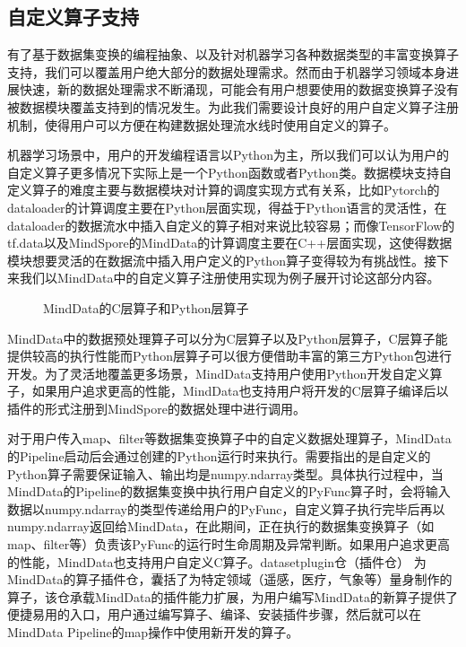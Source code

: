 \documentclass[letterpaper,10pt,english]{sphinxmanual}
\let\sphinxpxdimen\pdfpxdimen\else\newdimen\sphinxpxdimen
\begin{document}
\subsection{自定义算子支持}
\label{\detokenize{chapter_data_processing/program_model:id8}}
\sphinxAtStartPar
有了基于数据集变换的编程抽象、以及针对机器学习各种数据类型的丰富变换算子支持，我们可以覆盖用户绝大部分的数据处理需求。然而由于机器学习领域本身进展快速，新的数据处理需求不断涌现，可能会有用户想要使用的数据变换算子没有被数据模块覆盖支持到的情况发生。为此我们需要设计良好的用户自定义算子注册机制，使得用户可以方便在构建数据处理流水线时使用自定义的算子。

\sphinxAtStartPar
机器学习场景中，用户的开发编程语言以Python为主，所以我们可以认为用户的自定义算子更多情况下实际上是一个Python函数或者Python类。数据模块支持自定义算子的难度主要与数据模块对计算的调度实现方式有关系，比如Pytorch的dataloader的计算调度主要在Python层面实现，得益于Python语言的灵活性，在dataloader的数据流水中插入自定义的算子相对来说比较容易；而像TensorFlow的tf.data以及MindSpore的MindData的计算调度主要在C++层面实现，这使得数据模块想要灵活的在数据流中插入用户定义的Python算子变得较为有挑战性。接下来我们以MindData中的自定义算子注册使用实现为例子展开讨论这部分内容。

\begin{figure}[H]
\centering
\capstart

\noindent\sphinxincludegraphics[width=800\sphinxpxdimen]{{operation}.png}
\caption{MindData的C层算子和Python层算子}\label{\detokenize{chapter_data_processing/program_model:id15}}\label{\detokenize{chapter_data_processing/program_model:mindspore-operator-example}}\end{figure}

\sphinxAtStartPar
MindData中的数据预处理算子可以分为C层算子以及Python层算子，C层算子能提供较高的执行性能而Python层算子可以很方便借助丰富的第三方Python包进行开发。为了灵活地覆盖更多场景，MindData支持用户使用Python开发自定义算子，如果用户追求更高的性能，MindData也支持用户将开发的C层算子编译后以插件的形式注册到MindSpore的数据处理中进行调用。

\sphinxAtStartPar
对于用户传入map、filter等数据集变换算子中的自定义数据处理算子，MindData的Pipeline启动后会通过创建的Python运行时来执行。需要指出的是自定义的Python算子需要保证输入、输出均是numpy.ndarray类型。具体执行过程中，当MindData的Pipeline的数据集变换中执行用户自定义的PyFunc算子时，会将输入数据以numpy.ndarray的类型传递给用户的PyFunc，自定义算子执行完毕后再以numpy.ndarray返回给MindData，在此期间，正在执行的数据集变换算子（如map、filter等）负责该PyFunc的运行时生命周期及异常判断。如果用户追求更高的性能，MindData也支持用户自定义C算子。dataset\sphinxhyphen{}plugin仓（插件仓）
为MindData的算子插件仓，囊括了为特定领域（遥感，医疗，气象等）量身制作的算子，该仓承载MindData的插件能力扩展，为用户编写MindData的新算子提供了便捷易用的入口，用户通过编写算子、编译、安装插件步骤，然后就可以在MindData
Pipeline的map操作中使用新开发的算子。
\end{document}
